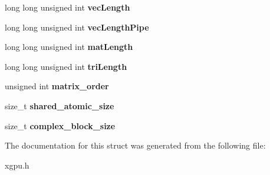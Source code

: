 \begin{DoxyCompactItemize}
\item 
long long unsigned int {\bfseries vec\+Length}\hypertarget{struct_x_g_p_u_info_struct_af69ac084c204c1c7499343db87209bb0}{}\label{struct_x_g_p_u_info_struct_af69ac084c204c1c7499343db87209bb0}

\item 
long long unsigned int {\bfseries vec\+Length\+Pipe}\hypertarget{struct_x_g_p_u_info_struct_a0a063cb356c08764cc77515505df296b}{}\label{struct_x_g_p_u_info_struct_a0a063cb356c08764cc77515505df296b}

\item 
long long unsigned int {\bfseries mat\+Length}\hypertarget{struct_x_g_p_u_info_struct_aaf3029326d43d1b1b85642441f2dea9f}{}\label{struct_x_g_p_u_info_struct_aaf3029326d43d1b1b85642441f2dea9f}

\item 
long long unsigned int {\bfseries tri\+Length}\hypertarget{struct_x_g_p_u_info_struct_adfbe3078b18bea61c066b601957830f2}{}\label{struct_x_g_p_u_info_struct_adfbe3078b18bea61c066b601957830f2}

\item 
unsigned int {\bfseries matrix\+\_\+order}\hypertarget{struct_x_g_p_u_info_struct_acf69a09bc88ee8b34bb93ea93e2a38a4}{}\label{struct_x_g_p_u_info_struct_acf69a09bc88ee8b34bb93ea93e2a38a4}

\item 
size\+\_\+t {\bfseries shared\+\_\+atomic\+\_\+size}\hypertarget{struct_x_g_p_u_info_struct_a82ff5c7c4ac5cf1544d934c05d97a3f1}{}\label{struct_x_g_p_u_info_struct_a82ff5c7c4ac5cf1544d934c05d97a3f1}

\item 
size\+\_\+t {\bfseries complex\+\_\+block\+\_\+size}\hypertarget{struct_x_g_p_u_info_struct_ac574062316dbc70dc42bba0dfc235f78}{}\label{struct_x_g_p_u_info_struct_ac574062316dbc70dc42bba0dfc235f78}

\end{DoxyCompactItemize}


The documentation for this struct was generated from the following file\+:\begin{DoxyCompactItemize}
\item 
xgpu.\+h\end{DoxyCompactItemize}
